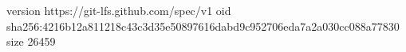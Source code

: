version https://git-lfs.github.com/spec/v1
oid sha256:4216b12a811218c43c3d35e50897616dabd9c952706eda7a2a030cc088a77830
size 26459
